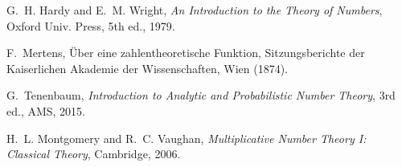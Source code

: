 \documentclass[reprint,amsmath,amssymb,aps,pra]{revtex4-2}
\begin{document}

\begin{thebibliography}{9}

G.~H. Hardy and E.~M. Wright,
\textit{An Introduction to the Theory of Numbers},
Oxford Univ. Press, 5th ed., 1979.

F.~Mertens,
\"Uber eine zahlentheoretische Funktion,
Sitzungsberichte der Kaiserlichen Akademie der Wissenschaften, Wien (1874).

G.~Tenenbaum,
\textit{Introduction to Analytic and Probabilistic Number Theory},
3rd ed., AMS, 2015.

H.~L. Montgomery and R.~C. Vaughan,
\textit{Multiplicative Number Theory I: Classical Theory},
Cambridge, 2006.

\end{thebibliography}
\end{document}
